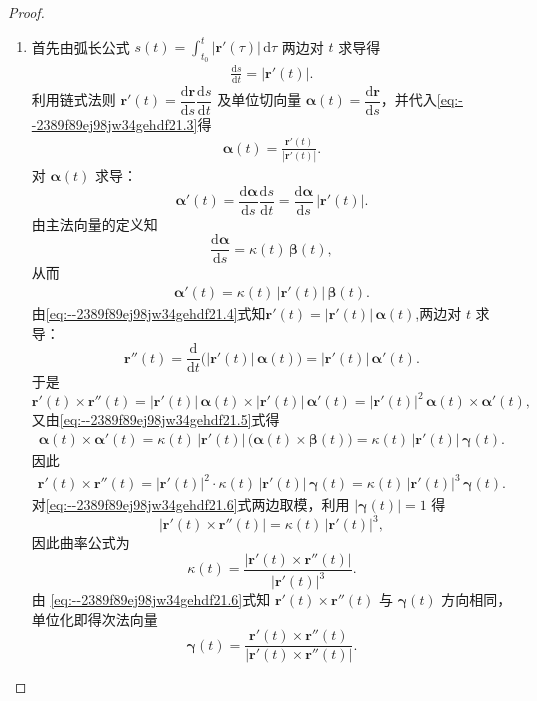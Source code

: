 \documentclass[../../main.tex]{subfiles}%
\begin{document}
\begin{proof}
\begin{enumerate}
\item 首先由弧长公式 $s(t)=\int_{t_0}^{t}|\bm{r}'(\tau)|\,\mathrm{d}\tau$ 两边对 $t$ 求导得
\begin{align}\label{eq:--2389f89ej98jw34gehdf21.3}
\frac{\mathrm{d}s}{\mathrm{d}t}=|\bm{r}'(t)|.
\tag{3}
\end{align}
利用链式法则 $\bm{r}'(t)=\dfrac{\mathrm{d}\bm{r}}{\mathrm{d}s}\dfrac{\mathrm{d}s}{\mathrm{d}t}$ 及单位切向量 $\bm{\alpha}(t)=\dfrac{\mathrm{d}\bm{r}}{\mathrm{d}s}$，并代入\eqref{eq:--2389f89ej98jw34gehdf21.3}得
\begin{align}\label{eq:--2389f89ej98jw34gehdf21.4}
\bm{\alpha}(t)=\frac{\bm{r}'(t)}{|\bm{r}'(t)|}.
\end{align}
对 $\bm{\alpha}(t)$ 求导：
\[
\bm{\alpha}'(t)=\frac{\mathrm{d}\bm{\alpha}}{\mathrm{d}s}\frac{\mathrm{d}s}{\mathrm{d}t}
=\frac{\mathrm{d}\bm{\alpha}}{\mathrm{d}s}\,|\bm{r}'(t)|.
\]
由主法向量的定义知
\[
\frac{\mathrm{d}\bm{\alpha}}{\mathrm{d}s}=\kappa(t)\,\bm{\beta}(t),
\]
从而
\begin{align}\label{eq:--2389f89ej98jw34gehdf21.5}
\bm{\alpha}'(t)=\kappa(t)\,|\bm{r}'(t)|\,\bm{\beta}(t).
\end{align}
由\eqref{eq:--2389f89ej98jw34gehdf21.4}式知$\bm{r}'(t)=|\bm{r}'(t)|\,\bm{\alpha}(t)$,两边对 $t$ 求导：
\[
\bm{r}''(t)=\frac{\mathrm{d}}{\mathrm{d}t}\bigl(|\bm{r}'(t)|\,\bm{\alpha}(t)\bigr)
=|\bm{r}'(t)|\,\bm{\alpha}'(t).
\]
于是
\[
\bm{r}'(t)\times\bm{r}''(t)=|\bm{r}'(t)|\,\bm{\alpha}(t)\times
|\bm{r}'(t)|\,\bm{\alpha}'(t)
=|\bm{r}'(t)|^2\,\bm{\alpha}(t)\times\bm{\alpha}'(t),
\]
又由\eqref{eq:--2389f89ej98jw34gehdf21.5}式得
\begin{align*}
\bm{\alpha}(t)\times\bm{\alpha}'(t)
=\kappa(t)\,|\bm{r}'(t)|\,\bigl(\bm{\alpha}(t)\times\bm{\beta}(t)\bigr)
=\kappa(t)\,|\bm{r}'(t)|\,\bm{\gamma}(t).
\end{align*}
因此
\begin{align}\label{eq:--2389f89ej98jw34gehdf21.6}
\bm{r}'(t)\times\bm{r}''(t)=|\bm{r}'(t)|^2\cdot\kappa(t)\,|\bm{r}'(t)|\,\bm{\gamma}(t)
=\kappa(t)\,|\bm{r}'(t)|^3\,\bm{\gamma}(t).
\end{align}
对\eqref{eq:--2389f89ej98jw34gehdf21.6}式两边取模，利用 $|\bm{\gamma}(t)|=1$ 得
\[
|\bm{r}'(t)\times\bm{r}''(t)|=\kappa(t)\,|\bm{r}'(t)|^3,
\]
因此曲率公式为
\[
\kappa(t)=\frac{|\bm{r}'(t)\times\bm{r}''(t)|}{|\bm{r}'(t)|^3}.
\]
由 \eqref{eq:--2389f89ej98jw34gehdf21.6}式知 $\bm{r}'(t)\times\bm{r}''(t)$ 与 $\bm{\gamma}(t)$ 方向相同，单位化即得次法向量
\[
\bm{\gamma}(t)=\frac{\bm{r}'(t)\times\bm{r}''(t)}{|\bm{r}'(t)\times\bm{r}''(t)|}.
\]
\end{enumerate}
\end{proof}
\end{document}
